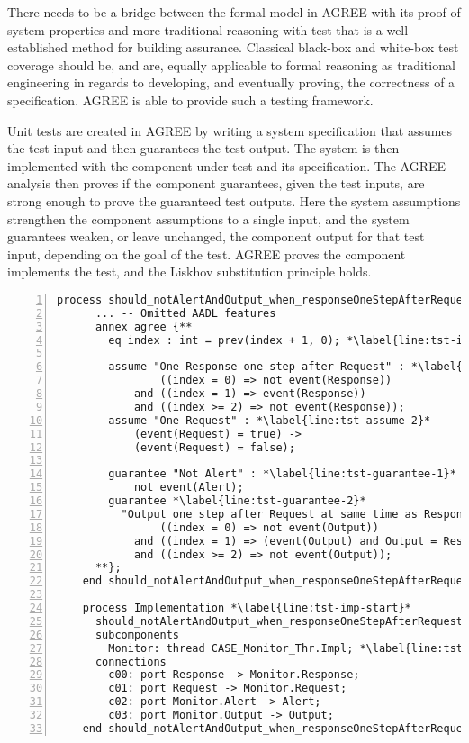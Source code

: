 There needs to be a bridge between the formal model in AGREE with its proof of system properties and more traditional reasoning with test that is a well established method for building assurance.
Classical black-box and white-box test coverage should be, and are, equally applicable to formal reasoning as traditional engineering in regards to developing, and eventually proving, the correctness of a specification.
AGREE is able to provide such a testing framework.

Unit tests are created in AGREE by writing a system specification that assumes the test input and then guarantees the test output.
The system is then implemented with the component under test and its specification.
The AGREE analysis then proves if the component guarantees, given the test inputs, are strong enough to prove the guaranteed test outputs.
Here the system assumptions strengthen the component assumptions to a single input, and the system guarantees weaken, or leave unchanged, the component output for that test input, depending on the goal of the test.
AGREE proves the component implements the test, and the Liskhov substitution principle holds.

\newsavebox{\tst}
\begin{lrbox}{\tst}
  \begin{lstlisting}[style=agree,numbers=left]
    process should_notAlertAndOutput_when_responseOneStepAfterRequest
      ... -- Omitted AADL features
      annex agree {**
        eq index : int = prev(index + 1, 0); *\label{line:tst-index}*
        
        assume "One Response one step after Request" : *\label{line:tst-assume-1}*
                ((index = 0) => not event(Response))
            and ((index = 1) => event(Response))
            and ((index >= 2) => not event(Response));
        assume "One Request" : *\label{line:tst-assume-2}*
            (event(Request) = true) ->
            (event(Request) = false);
        
        guarantee "Not Alert" : *\label{line:tst-guarantee-1}*
            not event(Alert);
        guarantee *\label{line:tst-guarantee-2}*
          "Output one step after Request at same time as Response" :
                ((index = 0) => not event(Output))
            and ((index = 1) => (event(Output) and Output = Response))
            and ((index >= 2) => not event(Output));
      **};
    end should_notAlertAndOutput_when_responseOneStepAfterRequest;
    
    process Implementation *\label{line:tst-imp-start}*
      should_notAlertAndOutput_when_responseOneStepAfterRequest.test
      subcomponents
        Monitor: thread CASE_Monitor_Thr.Impl; *\label{line:tst-imp-comp}*
      connections
        c00: port Response -> Monitor.Response;
        c01: port Request -> Monitor.Request;
        c02: port Monitor.Alert -> Alert;
        c03: port Monitor.Output -> Output;
    end should_notAlertAndOutput_when_responseOneStepAfterRequest.test; *\label{line:tst-imp-end}*
  \end{lstlisting}
\end{lrbox}


